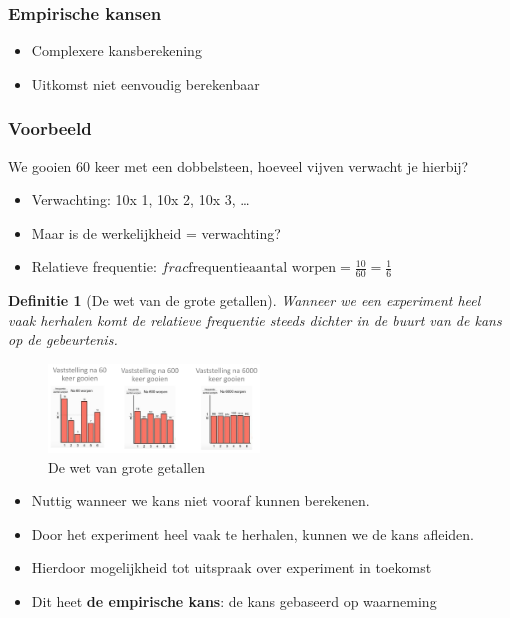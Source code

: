 \documentclass{article}
\newtheorem{theorem}{Definitie}[section]
\begin{document}
\subsubsection{Empirische kansen}

\begin{itemize}
    \item Complexere kansberekening
    \item Uitkomst niet eenvoudig berekenbaar
\end{itemize}


\subsubsection{Voorbeeld}
We gooien 60 keer met een dobbelsteen, hoeveel vijven verwacht je hierbij?

\begin{itemize}
    \item Verwachting: 10x 1, 10x 2, 10x 3, \dots
    \item Maar is de werkelijkheid = verwachting?
    \item Relatieve frequentie: $frac{\text{frequentie}}{\text{aantal worpen}} = \frac{10}{60} = \frac16$
\end{itemize}

\begin{theorem}[De wet van de grote getallen]
    Wanneer we een experiment heel vaak herhalen komt de relatieve frequentie steeds dichter in de buurt van de kans op de gebeurtenis.
\end{theorem}

\begin{figure}[H]
    \centering
    \includegraphics[width=0.5\textwidth]{wet-grote-getallen.png}
    \caption{De wet van grote getallen}
\end{figure}

\begin{itemize}
    \item Nuttig wanneer we kans niet vooraf kunnen berekenen.
    \item Door het experiment heel vaak te herhalen, kunnen we de kans afleiden.
    \item Hierdoor mogelijkheid tot uitspraak over experiment in toekomst
    \item Dit heet \textbf{de empirische kans}: de kans gebaseerd op waarneming
\end{itemize}
\end{document}
